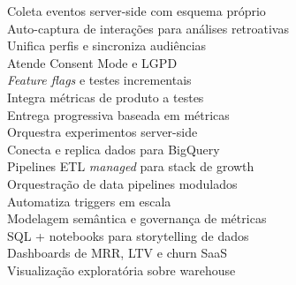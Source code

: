 \begin{commentB}
 Coleta eventos server-side com esquema próprio\\
 Auto-captura de interações para análises retroativas\\
 Unifica perfis e sincroniza audiências\\
 Atende Consent Mode e LGPD\\
[0.5em]

 \textit{Feature flags} e testes incrementais\\
 Integra métricas de produto a testes\\
 Entrega progressiva baseada em métricas\\
 Orquestra experimentos server-side\\
[0.5em]

 Conecta e replica dados para BigQuery\\
 Pipelines ETL \textit{managed} para stack de growth\\
 Orquestração de data pipelines modulados\\
 Automatiza triggers em escala\\
[0.5em]

 Modelagem semântica e governança de métricas\\
 SQL + notebooks para storytelling de dados\\
 Dashboards de MRR, LTV e churn SaaS\\
 Visualização exploratória sobre warehouse\\
[0.5em]


\end{commentB}
